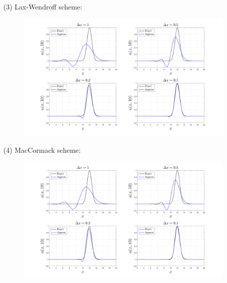 \documentclass{article}
\begin{document}
\begin{itemize}
\begin{itemize}
        \item[(3)] Lax-Wendroff scheme:
        \newline\newline
        \begin{figure}[H]
            \begin{center}
            \includegraphics[scale = 0.25]{prob_2_laxwendroff_subplots.png}
            \end{center}
        \end{figure}

        \item[(4)] MacCormack scheme:
        \newline\newline
        \begin{figure}[H]
        \begin{center}
            \includegraphics[scale = 0.25]{prob_2_maccormack_subplots.png}
        \end{center}
        \end{figure}
        

\end{itemize}
\end{itemize}
\end{document}
